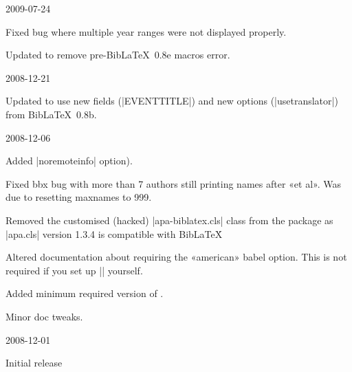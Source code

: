 \documentclass{ltxdockit}
\begin{document}
\begin{changelog}
\begin{release}{0.4}{2009-07-24}
\item Fixed bug where multiple year ranges were not displayed properly.
\item Updated to remove pre-Bib\LaTeX\ 0.8e macros error.
\end{release}

\begin{release}{0.3}{2008-12-21}
\item Updated to use new fields (|EVENTTITLE|) and new options
  (|usetranslator|) from Bib\LaTeX\ 0.8b.
\end{release}

\begin{release}{0.2}{2008-12-06}
\item Added |noremoteinfo| option).
\item Fixed bbx bug with more than 7 authors still printing names after «et al». Was
  due to resetting maxnames to 999.
\item Removed the customised (hacked) |apa-biblatex.cls| class from the package as
  |apa.cls| version 1.3.4 is compatible with Bib\LaTeX\.
\item Altered documentation about requiring the «american» babel option.
  This is not required if you set up |\DeclareQuotePunctuation| yourself.
\item Added minimum required version of .
\item Minor doc tweaks.
\end{release}

\begin{release}{0.1}{2008-12-01}
\item Initial release
\end{release}



\end{changelog}
\end{document}
